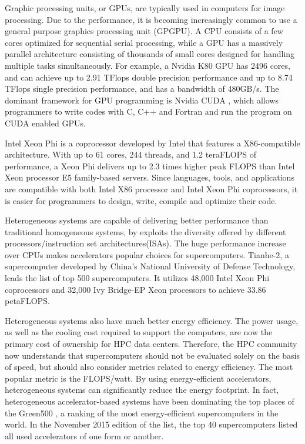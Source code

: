 
Graphic processing units, or GPUs, are typically used in computers for image 
processing. 
Due to the performance, it is becoming increasingly common to use a general purpose 
graphics processing unit (GPGPU).
A CPU consists of a few cores optimized for sequential serial processing,
while a GPU has a massively parallel architecture 
consisting of thousands of small cores designed for handling multiple tasks 
simultaneously.
For example, a Nvidia K80 GPU \cite{nv_k80_spec} has 2496 cores, and can achieve up to 2.91 TFlops 
double precision performance and up to 8.74 TFlops single precision performance, 
and has a bandwidth of 480GB/s.
The dominant framework for GPU programming is Nvidia CUDA \cite{Nickolls:2008:SPP:1365490.1365500}, which allows 
programmers to write codes with C, C++ and Fortran and run the program on CUDA
enabled GPUs.


Intel Xeon Phi\cite{Jeffers:2013:IXP:2523262} is a coprocessor developed by Intel that features a 
X86-compatible architecture. With up to 61 cores, 244 threads, 
and 1.2 teraFLOPS of performance, a Xeon Phi delivers up to 2.3 times higher 
peak FLOPS than Intel Xeon processor E5 family-based servers.
Since languages, tools, and applications are compatible with both Intel X86 
processor and Intel Xeon Phi coprocessors, it is easier for programmers to
design, write, compile and optimize their code. 




Heterogeneous systems are capable of delivering better performance than 
traditional homogeneous systems, by exploits the diversity offered by different 
processors/instruction set architectures(ISAs). 
The huge performance increase over CPUs makes accelerators popular choices for
supercomputers. Tianhe-2\cite{Liao2014}, a supercomputer developed by China’s National 
University of Defense Technology, leads the list of top 500 supercomputers\cite{top500-2015-11}.
It utilizes 48,000  Intel Xeon Phi coprocessors and 32,000 Ivy Bridge-EP Xeon 
processors to achieve 33.86 petaFLOPS.

Heterogeneous systems also have much better energy efficiency. 
The power usage, as well as the cooling cost required to support the computers,
are now the primary cost of ownership for HPC data centers. Therefore,
the HPC community now understands that supercomputers should not be evaluated
solely on the basis of speed, but should also consider metrics related to 
energy efficiency. The most popular metric is the FLOPS/watt.
By using energy-efficient accelerators,
heterogeneous systems can significantly reduce the energy footprint. 
In fact, heterogeneous accelerator-based systems have been dominating the 
top places of the Green500 \cite{green500},
a ranking of the most energy-efficient supercomputers in the world. 
In the November 2015 edition of the list\cite{green500-2015-11}, 
the top 40 supercomputers listed all used accelerators of one form or another.

